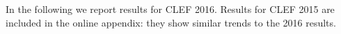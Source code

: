 
In the following we report results for CLEF 2016. Results for CLEF 2015 are included in the online appendix: they show similar trends to the 2016 results.

%
%
%
